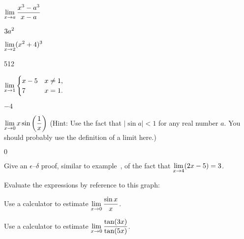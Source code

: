 \begin{exercises}
\exercise $\displaystyle\lim _{x\to a } {x^3 -a^3\over x-a}$
\begin{answer} $\displaystyle 3a^2$
\end{answer}

\exercise $\displaystyle\lim _{x\to 2 } (x^2 +4)^3$
\begin{answer} 512
\end{answer}

\exercise $\displaystyle\lim _{x\to 1 } \begin{cases}
x-5 & x\neq 1, \\
7 & x=1. \end{cases}$
\begin{answer} $-4$
\end{answer}

\endtwocol

\msk
\exercise $\displaystyle\lim _{x\to 0 } x\sin \left( {1\over x}\right)$
(Hint: Use the fact that $|\sin a |< 1 $ for any real number $a$. You
should probably use the definition of a limit here.)
\begin{answer} $0$
\end{answer}

\exercise Give an $\epsilon$--$\delta$ proof, similar to
example~,
of the fact that 
$\displaystyle \lim_{x\to 4} (2x-5) = 3$. 
 
\exercise Evaluate the expressions by reference to this graph:\hfill\break



\exercise Use a calculator to estimate $\displaystyle\lim_{x\to 0}
{\sin x\over x}$.

\exercise Use a calculator to estimate $\displaystyle\lim_{x\to 0}
{\tan(3x)\over\tan(5x)}$.

\end{exercises}
